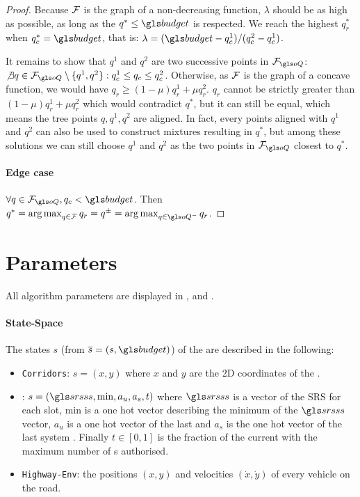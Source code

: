 \begin{proof}
    Because $\mathcal{F}$ is the graph of a non-decreasing function, $\lambda$ should be as high as possible, as long as the  $q^*\leq\budget$ is respected. We reach the highest $q_r^*$ when $q^*_c=\budget$, that is: $\lambda=(\budget-q_c^1)/(q_c^2-q_c^1)$.

    It remains to show that $q^1$ and $q^2$ are two successive points in $\cF_{\oQ}$: $\not\exists q\in\cF_{\oQ}\setminus\{q^1, q^2\}: q^1_c \leq q_c \leq q^2_c$. Otherwise, as $\mathcal{F}$ is the graph of a concave function, we would have $q_r \geq (1-\mu)q_r^1 + \mu q_r^2$. $q_r$ cannot be strictly greater than $(1-\mu)q_r^1 + \mu q_r^2$ which would contradict $q^*$, but it can still be equal, which means the tree points $q, q^1, q^2$ are aligned. In fact, every points aligned with $q^1$ and $q^2$ can also be used to construct mixtures resulting in $q^*$, but among these solutions we can still choose $q^1$ and $q^2$ as the two points in $\cF_{\oQ}$ closest to $q^*$.

    \paragraph{Edge case}

    $\forall q\in\cF_{\oQ}, q_c < \budget$. Then  $q^* =  \argmax_{q\in\cF} q_r = q^\pm =  \argmax_{q\in \oQ^-} q_r$.
\end{proof}

\section{Parameters}
\label{sec:params:appendix}

All algorithm parameters are displayed in , and .


\paragraph{State-Space}

The states $s$ (from $\os=(s,\budget)$) of the  are described in the following:

\begin{itemize}
    \item \texttt{Corridors}: $s = (x,y)$ where $x$ and $y$ are the 2D coordinates of the .
    \item \texttt{}: $s = (\srs,\text{min},a_u,a_s,t)$ where $\srs$ is a vector of the \gls{SRS} for each slot, $\text{min}$ is a one hot vector describing the minimum of the $\srs$ vector, $a_u$ is a one hot vector of the last   and $a_s$ is the one hot vector of the last system . Finally $t\in[0,1]$ is the fraction of the current  with the maximum number of s authorised.
    \item \texttt{Highway-Env}: the positions $(x, y)$ and velocities $(\dot{x}, \dot{y})$ of every vehicle on the road.
\end{itemize}


